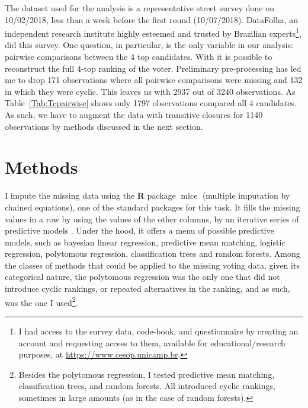 \documentclass[hidelinks,11pt]{article}
\begin{document}
The dataset used for the analysis is a representative street survey done on
10/02/2018, less than a week before the first round (10/07/2018). DataFolha, an
independent research institute highly esteemed and trusted by Brazilian
experts\footnote{I had access to the survey data, code-book, and questionnaire
by creating an account and requesting access to them, available for
educational/research purposes, at \url{https://www.cesop.unicamp.br}.}, did this
survey. One question, in particular, is the only variable in our analysis:
pairwise comparisons between the 4 top candidates. With it is possible to
reconstruct the full 4-top ranking of the voter. Preliminary pre-processing has
led me to drop 171 observations where all pairwise comparisons were missing and
132 in which they were cyclic. This leaves us with 2937 out of 3240
observations. As Table~\ref{Tab:Tcpairwise} shows only 1797 observations
compared all 4 candidates. As such, we have to augment the data with transitive
closures for 1140 observations by methods discussed in the next section.

\begin{table}[]\centering {}
\caption{Frequency of pairwise comparisons in the dataset.}

\label{Tab:Tcpairwise}
\end{table}


\section{Methods}

I impute the missing data using the \textbf{\textsf{R}} package
\(\operatorname{mice}\) (multiple imputation by chained equations), one of the
standard packages for this task. It fills the missing values in a row by using
the values of the other columns, by an iterative series of predictive models
\parencite{vanbuuren2018imputation}. Under the hood, it offers a menu of
possible predictive models, such as bayesian linear regression, predictive mean
matching, logistic regression, polytomous regression, classification trees and
random forests. Among the classes of methods that could be applied to the
missing voting data, given its categorical nature, the polytomous regression was
the only one that did not introduce cyclic rankings, or repeated alternatives in
the ranking, and as such, was the one I used\footnote{Besides the polytomous
regression, I tested predictive mean matching, classification trees, and random
forests. All introduced cyclic rankings, sometimes in large amounts (as in the
case of random forests).}.
\end{document}
